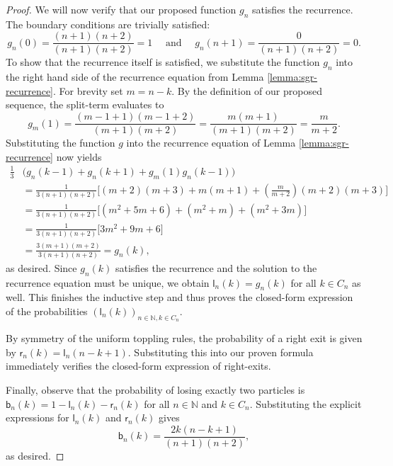 \documentclass[11pt]{article}
\newcommand{\N}{\mathbb{N}}
\newcommand{\sgrleft}[2]{\mathsf{l}_{#1}(#2)}
\newcommand{\sgrright}[2]{\mathsf{r}_{#1}(#2)}
\newcommand{\sgrboth}[2]{\mathsf{b}_{#1}(#2)}
\begin{document}
\begin{proof}
    We will now verify that our proposed function $g_n$ satisfies the recurrence. The boundary conditions are trivially satisfied: $$g_n(0) = \frac{(n+1)(n+2)}{(n+1)(n+2)} = 1 \quad \text{ and } \quad g_n(n+1) = \frac{0}{(n+1)(n+2)} = 0.$$ 
    To show that the recurrence itself is satisfied, we substitute the function $g_n$ into the right hand side of the recurrence equation from Lemma \ref{lemma:sgr-recurrence}. For brevity set $m = n-k$. By the definition of our proposed sequence, the split-term evaluates to $$g_m(1) = \frac{(m-1+1)(m-1+2)}{(m+1)(m+2)} = \frac{m(m+1)}{(m+1)(m+2)} = \frac{m}{m+2}.$$ 
    Substituting the function $g$ into the recurrence equation of Lemma \ref{lemma:sgr-recurrence} now yields
    \begin{align*}
        \frac{1}{3} &\Big( g_n(k-1) + g_n(k+1) + g_m(1)g_n(k-1) \Big) \\
        &= \frac{1}{3(n+1)(n+2)} \bigg[ (m+2)(m+3) + m(m+1) + \left(\frac{m}{m+2}\right)(m+2)(m+3) \bigg] \\
        &= \frac{1}{3(n+1)(n+2)} \bigg[ (m^2 + 5m + 6) + (m^2 + m) + (m^2 + 3m) \bigg] \\
        &= \frac{1}{3(n+1)(n+2)} \bigg[ 3m^2 + 9m + 6 \bigg] \\
        &= \frac{3(m+1)(m+2)}{3(n+1)(n+2)} = g_n(k),
    \end{align*}
    as desired. Since $g_n(k)$ satisfies the recurrence and the solution to the recurrence equation must be unique, we obtain $\sgrleft{n}{k} = g_n(k)$ for all $k\in C_n$ as well. This finishes the inductive step and thus proves the closed-form expression of the probabilities $(\sgrleft{n}{k})_{n\in\N,k\in C_n}$.

    By symmetry of the uniform toppling rules, the probability of a right exit is given by $\sgrright{n}{k} = \sgrleft{n}{n-k+1}$. Substituting this into our proven formula immediately verifies the closed-form expression of right-exits. 

    Finally, observe that the probability of losing exactly two particles is $\sgrboth{n}{k} = 1 - \sgrleft{n}{k} - \sgrright{n}{k}$ for all $n\in\N$ and $k\in C_n$. Substituting the explicit expressions for $\sgrleft{n}{k}$ and $\sgrright{n}{k}$ gives 
     $$\sgrboth{n}{k} = \frac{2k(n-k+1)}{(n+1)(n+2)},$$
     as desired.
\end{proof}
\end{document}
